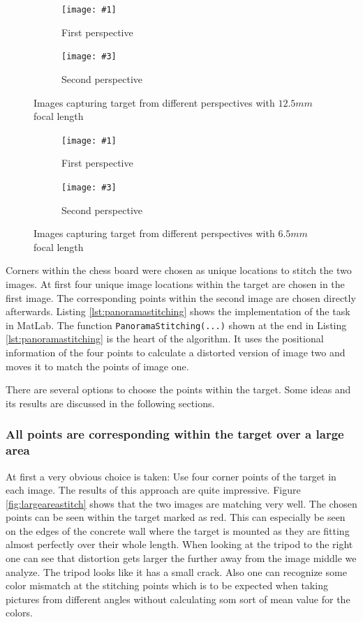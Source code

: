 \documentclass[
a4paper,     %
12pt         %
]{scrartcl}  %
\newcommand{\sidebysidepic}[6]{
\begin{figure}[ht!]%
\begin{subfigure}{.5\textwidth}%
  \centering%
  \texttt{[image: \#1]}%
  \caption{#2}%
\end{subfigure}%
\begin{subfigure}{.5\textwidth}%
  \centering%
  \texttt{[image: \#3]}%
  \caption{#4}%
\end{subfigure}%
\caption{#5}%
\label{#6}%
\end{figure}%
}
\begin{document}
\sidebysidepic{./Bildg_Messtechnik_Lab/PanoramaStitching/images/image_1.png}
{First perspective}
{./Bildg_Messtechnik_Lab/PanoramaStitching/images/image_2.png}
{Second perspective}
{Images capturing target from different perspectives with $12.5mm$ focal length}
{fig:photo12.5mm}

\sidebysidepic{./Bildg_Messtechnik_Lab/PanoramaStitching/images/image_b1.png}
{First perspective}
{./Bildg_Messtechnik_Lab/PanoramaStitching/images/image_b2.png}
{Second perspective}
{Images capturing target from different perspectives with $6.5mm$ focal length}
{fig:photo6.5mm}

Corners within the chess board were chosen as unique locations to stitch the two images.
At first four unique image locations within the target are chosen in the first image.
The corresponding points within the second image are chosen directly afterwards.
Listing \ref{lst:panoramastitching} shows the implementation of the task in MatLab.
The function \lstinline{PanoramaStitching(...)} shown at the end in Listing \ref{lst:panoramastitching} is the heart of the algorithm.
It uses the positional information of the four points to calculate a distorted version of image two and moves it to match the points of image one.



There are several options to choose the points within the target.
Some ideas and its results are discussed in the following sections.

\subsubsection{All points are corresponding within the target over a large area}

At first a very obvious choice is taken: Use four corner points of the target in each image.
The results of this approach are quite impressive.
Figure \ref{fig:largeareastitch} shows that the two images are matching very well.
The chosen points can be seen within the target marked as red.
This can especially be seen on the edges of the concrete wall where the target is mounted as they are fitting almost perfectly over their whole length.
When looking at the tripod to the right one can see that distortion gets larger the further away from the image middle we analyze.
The tripod looks like it has a small crack.
Also one can recognize some color mismatch at the stitching points which is to be expected when taking pictures from different angles without calculating som sort of mean value for the colors.
\end{document}
